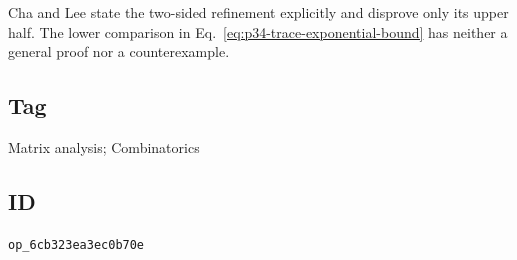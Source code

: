 Cha and Lee state the two-sided refinement explicitly and disprove only its
upper half.  The lower comparison in
Eq.~\eqref{eq:p34-trace-exponential-bound} has neither a general proof nor a
counterexample.

\subsection*{Tag}

Matrix analysis; Combinatorics

\subsection*{ID}

\texttt{op\_6cb323ea3ec0b70e}
